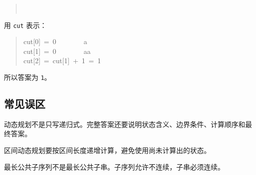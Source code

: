 \documentclass[UTF8,zihao=-4]{ctexart}
\begin{document}
\begin{quote}
\small\ttfamily\raggedright
{}\\
\end{quote}

用 \texttt{cut} 表示：

\begin{quote}
\small\ttfamily\raggedright
\relax cut[0]\ =\ 0\ \ \ \ \ \ \ \ a\\
\relax cut[1]\ =\ 0\ \ \ \ \ \ \ \ aa\\
\relax cut[2]\ =\ cut[1]\ +\ 1\ =\ 1\\
\end{quote}

所以答案为 \texttt{1}。

\subsection*{常见误区}

动态规划不是只写递归式。完整答案还要说明状态含义、边界条件、计算顺序和最终答案。

区间动态规划要按区间长度递增计算，避免使用尚未计算出的状态。

最长公共子序列不是最长公共子串。子序列允许不连续，子串必须连续。
\end{document}
